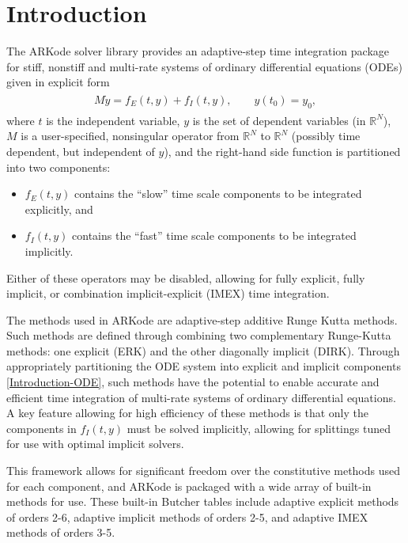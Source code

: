 \documentclass[letterpaper,10pt,english]{sphinxmanual}
\begin{document}
\chapter{Introduction}
\label{Introduction:introduction}\label{Introduction:id1}\label{Introduction::doc}\label{Introduction:arkode-documentation}
The ARKode solver library provides an adaptive-step time integration
package for stiff, nonstiff and multi-rate systems of ordinary
differential equations (ODEs) given in explicit form
\label{Introduction:equation-ODE}\begin{gather}
\begin{split}M \dot{y} = f_E(t,y) + f_I(t,y),  \qquad y(t_0) = y_0,\end{split}\label{Introduction-ODE}
\end{gather}
where \(t\) is the independent variable, \(y\) is the set of
dependent variables (in \(\mathbb{R}^N\)), \(M\) is a
user-specified, nonsingular operator from \(\mathbb{R}^N\) to
\(\mathbb{R}^N\) (possibly time dependent, but independent of
\(y\)), and the right-hand side function is partitioned into two
components:
\begin{itemize}
\item {} 
\(f_E(t,y)\) contains the ``slow'' time scale components to be
integrated explicitly, and

\item {} 
\(f_I(t,y)\)  contains the ``fast'' time scale components to be
integrated implicitly.

\end{itemize}

Either of these operators may be disabled, allowing for fully
explicit, fully implicit, or combination implicit-explicit (IMEX) time
integration.

The methods used in ARKode are adaptive-step additive Runge Kutta
methods. Such methods are defined through combining two complementary
Runge-Kutta methods: one explicit (ERK) and the other diagonally implicit
(DIRK). Through appropriately partitioning the ODE system into
explicit and implicit components \eqref{Introduction-ODE}, such methods have the
potential to enable accurate and efficient time integration of
multi-rate systems of ordinary differential equations.  A key
feature allowing for high efficiency of these methods is that only the
components in \(f_I(t,y)\) must be solved implicitly, allowing for
splittings tuned for use with optimal implicit solvers.

This framework allows for significant freedom over the constitutive
methods used for each component, and ARKode is packaged with a wide
array of built-in methods for use.  These built-in Butcher tables
include adaptive explicit methods of orders 2-6, adaptive implicit
methods of orders 2-5, and adaptive IMEX methods of orders 3-5.
\end{document}
